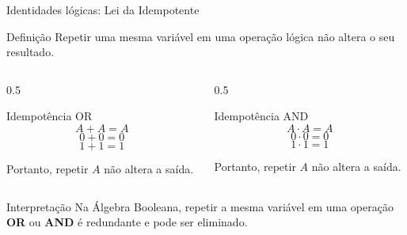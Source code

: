 
\begin{frame}{Identidades lógicas: Lei da Idempotente}
    \begin{block}{Definição}
        Repetir uma mesma variável em uma operação lógica não altera
        o seu resultado.
    \end{block}

    \vspace{0.3cm}

    \begin{columns}[T]

        \begin{column}{0.5\textwidth}
            \begin{block}{Idempotência OR}
                \[
                    \boxed{A + A = A}
                \]
                \[
                    0 + 0 = 0
                \]
                \[
                    1 + 1 = 1
                \]

                Portanto, repetir $A$ não altera a saída.
            \end{block}
        \end{column}

        \begin{column}{0.5\textwidth}
            \begin{block}{Idempotência AND}
                \[
                    \boxed{A \cdot A = A}
                \]
                \[
                    0 \cdot 0 = 0
                \]
                \[
                    1 \cdot 1 = 1
                \]

                Portanto, repetir $A$ não altera a saída.
            \end{block}
        \end{column}

    \end{columns}

    \begin{alertblock}{Interpretação}
        Na Álgebra Booleana, repetir a mesma variável em uma operação
        \textbf{OR} ou \textbf{AND} é redundante e pode ser eliminado.
    \end{alertblock}
\end{frame}